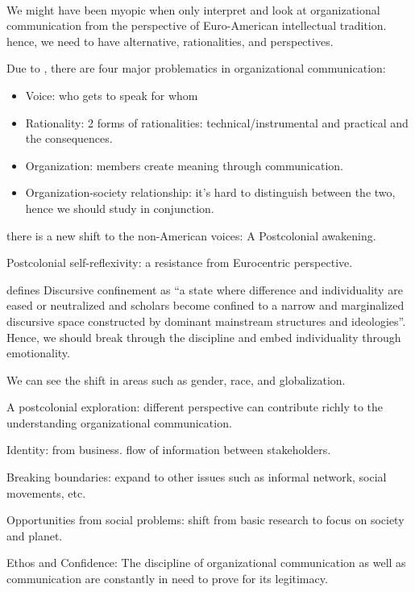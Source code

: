 \documentclass[
]{book}
\providecommand{\tightlist}{%
  \setlength{\itemsep}{0pt}\setlength{\parskip}{0pt}}
\begin{document}
\citep{Broadfoot_2007}~\\
We might have been myopic when only interpret and look at organizational communication from the perspective of Euro-American intellectual tradition. hence, we need to have alternative, rationalities, and perspectives.

Due to \citep{Mumby_1996}, there are four major problematics in organizational communication:

\begin{itemize}
\tightlist
\item
  Voice: who gets to speak for whom\\
\item
  Rationality: 2 forms of rationalities: technical/instrumental and practical and the consequences.\\
\item
  Organization: members create meaning through communication.\\
\item
  Organization-society relationship: it's hard to distinguish between the two, hence we should study in conjunction.
\end{itemize}

there is a new shift to the non-American voices: A Postcolonial awakening.

Postcolonial self-reflexivity: a resistance from Eurocentric perspective.

\citep{Shome_1996} defines Discursive confinement as ``a state where difference and individuality are eased or neutralized and scholars become confined to a narrow and marginalized discursive space constructed by dominant mainstream structures and ideologies''. Hence, we should break through the discipline and embed individuality through emotionality.

We can see the shift in areas such as gender, race, and globalization.

A postcolonial exploration: different perspective can contribute richly to the understanding organizational communication.

\citep{Cheney_2007}

Identity: from business. flow of information between stakeholders.

Breaking boundaries: expand to other issues such as informal network, social movements, etc.

Opportunities from social problems: shift from basic research to focus on society and planet.

Ethos and Confidence: The discipline of organizational communication as well as communication are constantly in need to prove for its legitimacy.
\end{document}

